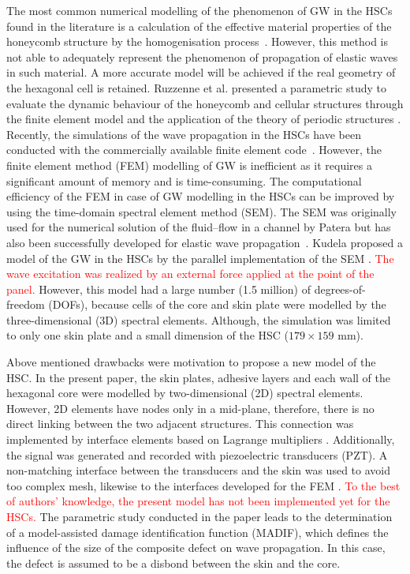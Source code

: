 \documentclass[sensors,article,submit,moreauthors,pdftex]{Definitions/mdpi}
\begin{document}
The most common numerical modelling of the phenomenon of GW in the HSCs found in the literature is a calculation of the effective material properties of the honeycomb structure by the homogenisation process~\cite{shi1995derivation, qi2008ultrasonic, mustapha2014leaky, baid2015dispersion, sikdar2016guided}.
However, this method is not able to adequately represent the phenomenon of propagation of elastic waves in such material.
A more accurate model will be achieved if the real geometry of the hexagonal cell is retained.
Ruzzenne et al. presented a parametric study to evaluate the dynamic behaviour of the honeycomb and cellular structures through the finite element model and the application of the theory of periodic structures \cite{ruzzene2003wave}.
Recently, the simulations of the wave propagation in the HSCs have been conducted with the commercially available finite element code~\cite{song2009guided, hosseini2013numerical, tian2015wavenumber, zhao2018wave}.
However, the finite element method (FEM) modelling of GW is inefficient as it requires a significant amount of memory and is time-consuming.
The computational efficiency of the FEM in case of GW modelling in the HSCs can be improved by using the time-domain spectral element method (SEM).
The SEM was originally used for the numerical solution of the fluid--flow in a channel by Patera \cite{patera1984spectral} but has also been successfully developed for elastic wave propagation~\cite{ostachowicz2011guided}.
Kudela proposed a model of the GW in the HSCs by the parallel implementation of the SEM \cite{kudela2016parallel}.
\textcolor{red}{The wave excitation was realized by an external force applied at the point of the panel.}
However, this model had a large number (1.5 million) of degrees-of-freedom (DOFs), because cells of the core and skin plate were modelled by the three-dimensional (3D) spectral elements.
Although, the simulation was limited to only one skin plate and a small dimension of the HSC (\(179 \times 159 \) mm).

Above mentioned drawbacks were motivation to propose a new model of the HSC.
In the present paper, the skin plates, adhesive layers and each wall of the hexagonal core were modelled by two-dimensional (2D) spectral elements.
However, 2D elements have nodes only in a mid-plane, therefore, there is no direct linking between the two adjacent structures.
This connection was implemented by interface elements based on Lagrange multipliers \cite{ashwin2014formulation, fiborek20192d}.
Additionally, the signal was generated and recorded with piezoelectric transducers (PZT).
A non-matching interface between the transducers and the skin was used to avoid too complex mesh, likewise to the interfaces developed for the FEM \cite{flemisch2000elasto, flemisch2012non}. 
\textcolor{red}{To the best of authors’ knowledge, the present model has not been implemented yet for the HSCs.}
The parametric study conducted in the paper leads to the determination of a model-assisted damage identification function (MADIF), which defines the influence of the size of the composite defect on wave propagation.
In this case, the defect is assumed to be a disbond between the skin and the core.
\end{document}
